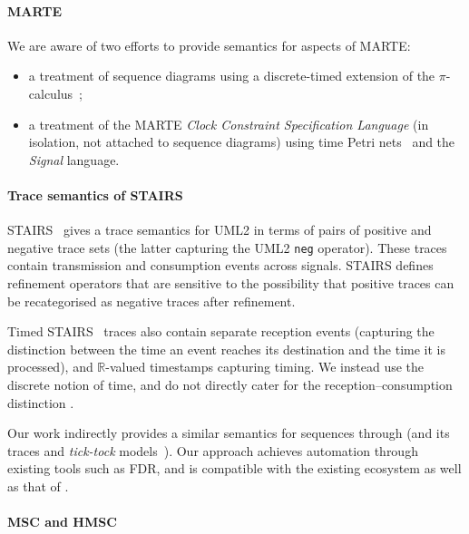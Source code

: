 \paragraph{MARTE}

We are aware of two efforts to provide semantics for aspects of MARTE:

\begin{itemize}
  \item
    a treatment of sequence diagrams using a discrete-timed extension of
    the \(\pi\)-calculus~\cite{Jin11-MARTEPiCalculus}; 
  \item 
    a treatment of the MARTE \emph{Clock Constraint Specification Language} (in
    isolation, not attached to sequence diagrams) using time Petri
    nets~\cite{Mallet09-MARTEClockNets} and the \emph{Signal} language.
\end{itemize}

\paragraph{Trace semantics of STAIRS}

STAIRS~\cite{Haugen03-STAIRS} gives a trace semantics for UML2 in terms
of pairs of positive and negative trace sets (the latter capturing the UML2
\texttt{neg} operator).  These traces contain
transmission and consumption events across signals.  STAIRS defines
refinement operators that are sensitive to the possibility that positive
traces can be recategorised as negative traces after refinement.

Timed
STAIRS~\cite{Haugen05-TimedSTAIRS} traces also contain separate reception
events (capturing the distinction between the time an event reaches
its destination and the time it is processed), and \(\mathbb R\)-valued
timestamps capturing timing.  We instead use the discrete \tockcsp{} notion
of time, and do not directly cater for the reception--consumption distinction
.

Our work indirectly provides a similar semantics for \langname{}
sequences through \tockcsp{} (and its traces and \emph{tick-tock} models~\cite{Baxter21-TickTock}).
Our approach achieves automation through existing tools such as FDR,
and is compatible with the existing \robostar{} ecosystem as well as that of
\tockcsp.

\paragraph{MSC and HMSC}

